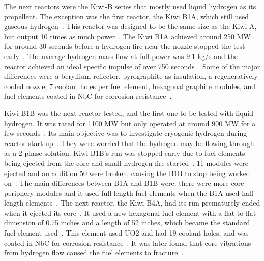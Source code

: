 \documentclass{article}
\begin{document}
The next reactors were the Kiwi-B series that mostly used liquid hydrogen as its propellent. The exception was the first reactor, the Kiwi B1A, which still used gaseous hydrogen~\cite{finseth1991rover}. This reactor was designed to be the same size as the Kiwi A, but output 10 times as much power~\cite{gerrish2014nuclear}. The Kiwi B1A achieved around 250 MW for around 30 seconds before a hydrogen fire near the nozzle stopped the test early~\cite{gerrish2014nuclear}. The average hydrogen mass flow at full power was 9.1 kg/s and the reactor achieved an ideal specific impulse of over 750 seconds~\cite{finseth1991rover}. Some of the major differences were a beryllium reflector, pyrographite as insulation, a regeneratively-cooled nozzle, 7 coolant holes per fuel element, hexagonal graphite modules, and fuel elements coated in NbC for corrosion resistance~\cite{finseth1991rover}. 


Kiwi B1B was the next reactor tested, and the first one to be tested with liquid hydrogen. It was rated for 1100 MW but only operated at around 900 MW for a few seconds~\cite{gerrish2014nuclear}. Its main objective was to investigate cryogenic hydrogen during reactor start up~\cite{finseth1991rover}. They were worried that the hydrogen may be flowing through as a 2-phase solution. Kiwi B1B's run was stopped early due to fuel elements being ejected from the core and small hydrogen fire started~\cite{finseth1991rover}. 11 modules were ejected and an addition 50 were broken, causing the B1B to stop being worked on~\cite{finseth1991rover}. The main differences between B1A and B1B were: there were more core periphery modules and it used full length fuel elements when the B1A used half-length elements~\cite{finseth1991rover}. 
The next reactor, the Kiwi B4A, had its run prematurely ended when it ejected its core~\cite{gerrish2014nuclear}. It used a new hexagonal fuel element with a flat to flat dimension of 0.75 inches and a length of 52 inches, which became the standard fuel element used~\cite{finseth1991rover}. This element used UO2 and had 19 coolant holes, and was coated in NbC for corrosion resistance~\cite{finseth1991rover}. It was later found that core vibrations from hydrogen flow caused the fuel elements to fracture~\cite{gerrish2014nuclear}. 
\end{document}

